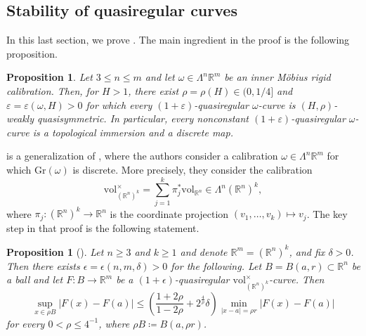 \documentclass[a4paper,leqno,11pt]{amsart}
\numberwithin{equation}{section}
\newtheorem{proposition}[theorem]{Proposition}
\theoremstyle{remark}
\theoremstyle{remark}
\newcommand{\R}{\mathbb{R}}
\newcommand{\vol}{\mathrm{vol}}
\newcommand{\Gr}{\mathrm{Gr}}
\begin{document}

\subsection{Stability of quasiregular curves}
In this last section, we prove . The main ingredient in the proof is the following proposition.

\begin{proposition}
\label{prop:HPP-revisited}
Let $3 \le n \le m$ and let $\omega \in \Lambda^n \R^m$ be an inner M\"obius rigid calibration. Then, for $H>1$, there exist $\rho = \rho(H) \in ( 0, 1/4 ]$ and $\varepsilon=\varepsilon(\omega,H)>0$ for which every $( 1 + \varepsilon )$-quasiregular $\omega$-curve is $(H, \rho )$-weakly quasisymmetric. In particular, every nonconstant $( 1 + \varepsilon )$-quasiregular $\omega$-curve is a topological immersion and a discrete map.
\end{proposition}
 is a generalization of \cite[Theorem 1.6]{Hei:Pan:Pry:23}, where the authors consider a calibration $\omega \in \Lambda^n \R^m$ for which $\Gr( \omega )$ is discrete. More precisely, they consider the calibration
\begin{equation}\label{eq:pullback:factor}
    \vol_{ ( \mathbb{R}^n )^{k} }^{ \times }
    =
    \sum_{ j = 1 }^{ k } \pi^{*}_j \vol_{ \mathbb{R}^n } \in \Lambda^n (\R^n)^k,
\end{equation}
where $\pi_j \colon ( \mathbb{R}^n )^{k} \to \mathbb{R}^n$ is the coordinate projection $(v_1,\ldots, v_k) \mapsto v_j$. The key step in that proof is the following statement.
\begin{proposition}[{\cite[Proposition 7.7]{Hei:Pan:Pry:23}}]\label{prop:7.7:HPP}
Let $n \geq 3$ and $k \geq 1$ and denote $\mathbb{R}^{m} = ( \mathbb{R}^{n} )^{k}$, and fix $\delta > 0$. Then there exists $\epsilon = \epsilon( n,m,\delta) > 0$ for the following. Let $B = B( a, r ) \subset \mathbb{R}^n$ be a ball and let $F \colon B \to \mathbb{R}^m$ be a $(1+\epsilon)$-quasiregular $\vol_{ ( \mathbb{R}^n )^{k} }^{ \times }$-curve. Then
\begin{equation*}
    \sup_{ x \in \rho B } | F(x) - F(a) | \leq \left( \frac{ 1+2\rho}{1-2\rho} + 2^{ \frac{4}{\rho} }\delta \right) \min_{ |x-a| = \rho r } | F(x) - F(a) |
\end{equation*}
for every $0 < \rho \leq 4^{-1}$, where $\rho B \coloneqq B( a, \rho r )$.
\end{proposition}
\end{document}

